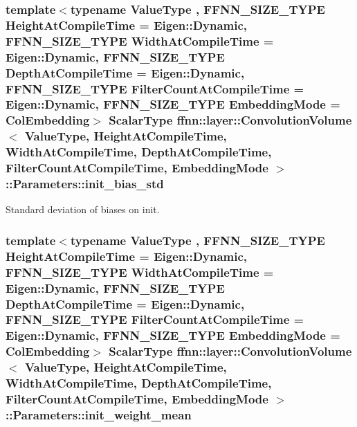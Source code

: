 \hypertarget{structffnn_1_1layer_1_1_convolution_volume_1_1_parameters_a7436c4e804e9cbd6c8bc1550bfaae5a9}{
\subsubsection[{init\-\_\-bias\-\_\-std}]{\setlength{\rightskip}{0pt plus 5cm}template$<$typename Value\-Type , F\-F\-N\-N\-\_\-\-S\-I\-Z\-E\-\_\-\-T\-Y\-P\-E Height\-At\-Compile\-Time = Eigen\-::\-Dynamic, F\-F\-N\-N\-\_\-\-S\-I\-Z\-E\-\_\-\-T\-Y\-P\-E Width\-At\-Compile\-Time = Eigen\-::\-Dynamic, F\-F\-N\-N\-\_\-\-S\-I\-Z\-E\-\_\-\-T\-Y\-P\-E Depth\-At\-Compile\-Time = Eigen\-::\-Dynamic, F\-F\-N\-N\-\_\-\-S\-I\-Z\-E\-\_\-\-T\-Y\-P\-E Filter\-Count\-At\-Compile\-Time = Eigen\-::\-Dynamic, F\-F\-N\-N\-\_\-\-S\-I\-Z\-E\-\_\-\-T\-Y\-P\-E Embedding\-Mode = Col\-Embedding$>$ {\bf Scalar\-Type} {\bf ffnn\-::layer\-::\-Convolution\-Volume}$<$ Value\-Type, Height\-At\-Compile\-Time, Width\-At\-Compile\-Time, Depth\-At\-Compile\-Time, Filter\-Count\-At\-Compile\-Time, {\bf Embedding\-Mode} $>$\-::Parameters\-::init\-\_\-bias\-\_\-std}}\label{structffnn_1_1layer_1_1_convolution_volume_1_1_parameters_a7436c4e804e9cbd6c8bc1550bfaae5a9}


Standard deviation of biases on init. 

\hypertarget{structffnn_1_1layer_1_1_convolution_volume_1_1_parameters_a9200f0ded178ab3c0bf95bb0fe2f064e}{
\subsubsection[{init\-\_\-weight\-\_\-mean}]{\setlength{\rightskip}{0pt plus 5cm}template$<$typename Value\-Type , F\-F\-N\-N\-\_\-\-S\-I\-Z\-E\-\_\-\-T\-Y\-P\-E Height\-At\-Compile\-Time = Eigen\-::\-Dynamic, F\-F\-N\-N\-\_\-\-S\-I\-Z\-E\-\_\-\-T\-Y\-P\-E Width\-At\-Compile\-Time = Eigen\-::\-Dynamic, F\-F\-N\-N\-\_\-\-S\-I\-Z\-E\-\_\-\-T\-Y\-P\-E Depth\-At\-Compile\-Time = Eigen\-::\-Dynamic, F\-F\-N\-N\-\_\-\-S\-I\-Z\-E\-\_\-\-T\-Y\-P\-E Filter\-Count\-At\-Compile\-Time = Eigen\-::\-Dynamic, F\-F\-N\-N\-\_\-\-S\-I\-Z\-E\-\_\-\-T\-Y\-P\-E Embedding\-Mode = Col\-Embedding$>$ {\bf Scalar\-Type} {\bf ffnn\-::layer\-::\-Convolution\-Volume}$<$ Value\-Type, Height\-At\-Compile\-Time, Width\-At\-Compile\-Time, Depth\-At\-Compile\-Time, Filter\-Count\-At\-Compile\-Time, {\bf Embedding\-Mode} $>$\-::Parameters\-::init\-\_\-weight\-\_\-mean}}\label{structffnn_1_1layer_1_1_convolution_volume_1_1_parameters_a9200f0ded178ab3c0bf95bb0fe2f064e}


